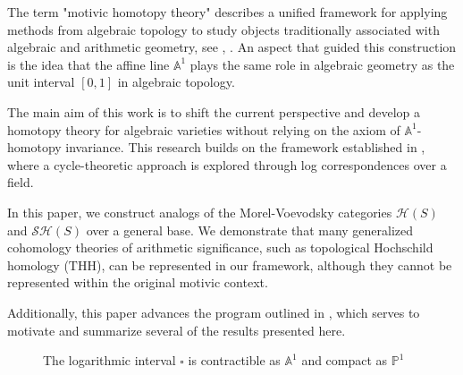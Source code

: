 \documentclass[11pt, a4paper]{amsart}
\theoremstyle{definition}
\numberwithin{equation}{subsection}
\newcommand{\THH}{\mathrm{THH}}
\newcommand{\boxx}{\square}
\begin{document}
The term "motivic homotopy theory" describes a unified framework for applying methods from algebraic topology to study objects traditionally associated with algebraic and 
arithmetic geometry, see \cite{MV}, \cite{zbMATH01194164}.
An aspect that guided this construction is the idea that the affine line $\mathbb{A}^1$ plays the same role in algebraic geometry as the unit interval $[0, 1]$ in algebraic topology. 

The main aim of this work is to shift the current perspective and develop a homotopy theory for algebraic varieties without relying on the axiom of $\mathbb{A}^1$-homotopy invariance. This research builds on the framework established in \cite{logDM}, where a cycle-theoretic approach is explored through log correspondences over a field.

In this paper, we construct analogs of the Morel-Voevodsky categories $\mathcal{H}(S)$ and $\mathcal{SH}(S)$ over a general base. We demonstrate that many generalized cohomology theories of arithmetic significance, such as topological Hochschild homology ($\THH$), can be represented in our framework, although they cannot be represented within the original motivic context.

Additionally, this paper advances the program outlined in \cite{logDMcras}, which serves to motivate and summarize several of the results presented here.



\begin{figure}[tbp]
\centering
{}
\caption{The logarithmic interval $\boxx$ is contractible as $\mathbb{A}^1$ and compact as $\mathbb{P}^1$}
\label{fig:exmp}
\end{figure}
\end{document}

